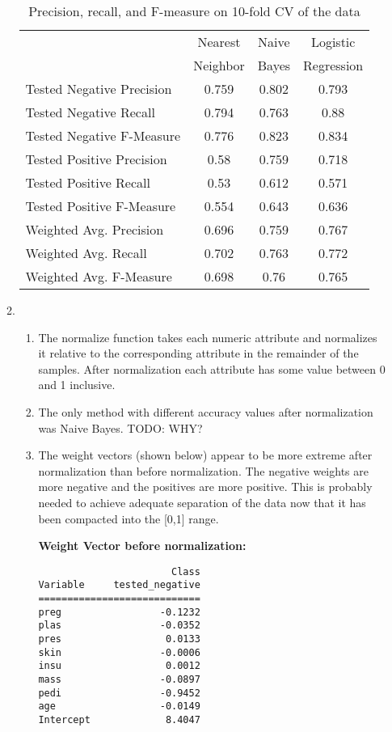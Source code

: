 \documentclass[12pt]{article}
\begin{document}
\begin{enumerate}
\begin{enumerate}
\begin{table}[htdp]
\caption{Precision, recall, and F-measure on 10-fold CV of the data}
\begin{center}
\begin{tabular}{l||c|c|c|}
               & Nearest & Naive & Logistic  \\
               & Neighbor &  Bayes & Regression  \\
               \hline
Tested Negative Precision & 0.759 & 0.802 & 0.793 \\
Tested Negative Recall & 0.794  & 0.763 & 0.88 \\
Tested Negative F-Measure & 0.776 & 0.823 & 0.834 \\
Tested Positive Precision & 0.58 & 0.759  & 0.718 \\
Tested Positive Recall & 0.53 & 0.612 & 0.571 \\
Tested Positive F-Measure &  0.554 & 0.643 & 0.636  \\
Weighted Avg. Precision & 0.696 & 0.759 & 0.767\\
Weighted Avg. Recall & 0.702  & 0.763 & 0.772 \\
Weighted Avg. F-Measure & 0.698   & 0.76  & 0.765  \\
\end{tabular}
\end{center}
\label{tab:partc}
\end{table}%

\item %
\begin{enumerate}
\item
The normalize function takes each numeric  attribute and normalizes it relative to the corresponding attribute in the remainder of the samples. After normalization each attribute has some value between 0 and 1 inclusive. 
\item
The only method with different accuracy values after normalization was Naive Bayes. TODO: WHY?

\item

The weight vectors (shown below) appear to be more extreme after normalization than before normalization. The negative weights are more negative and the positives are more positive. This is probably needed to achieve adequate separation of the data now that it has been compacted into the [0,1] range.


{\bf Weight Vector before normalization:}
\begin{verbatim}
                       Class
Variable     tested_negative
============================
preg                 -0.1232
plas                 -0.0352
pres                  0.0133
skin                 -0.0006
insu                  0.0012
mass                 -0.0897
pedi                 -0.9452
age                  -0.0149
Intercept             8.4047
\end{verbatim}


\end{enumerate}
\end{enumerate}
\end{enumerate}
\end{document}
